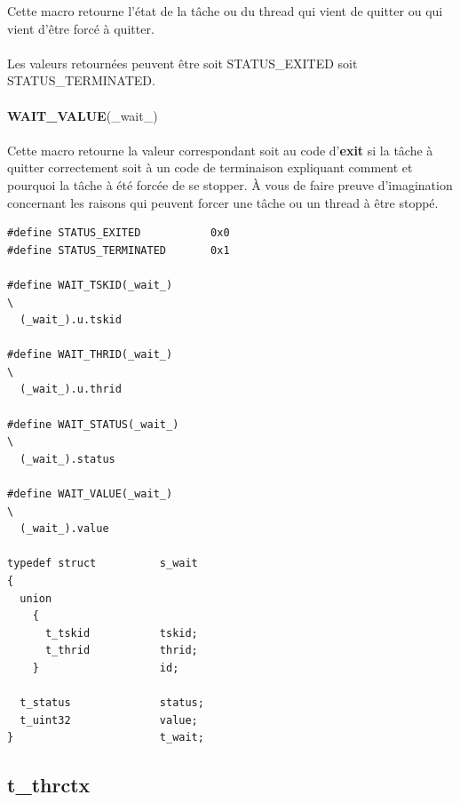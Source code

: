 \documentclass[10pt,a4wide]{article}
\begin{document}
Cette macro retourne l'\'etat de la t\^ache ou du thread qui vient de
quitter ou qui vient d'\^etre forc\'e \`a quitter.

\paragraph{}

Les valeurs retourn\'ees peuvent \^etre soit STATUS\_EXITED
soit STATUS\_TERMINATED.

\paragraph{}

\hspace{1.5cm}\textbf{WAIT\_VALUE}(\_wait\_)

\paragraph{}

Cette macro retourne la valeur correspondant soit au code d'\textbf{exit}
si la t\^ache \`a quitter correctement soit \`a un code de terminaison
expliquant comment et pourquoi la t\^ache \`a \'et\'e forc\'ee de se stopper.
\`A vous de faire preuve d'imagination concernant les raisons qui peuvent
forcer une t\^ache ou un thread \`a \^etre stopp\'e.

\begin{verbatim}
#define STATUS_EXITED           0x0
#define STATUS_TERMINATED       0x1

#define WAIT_TSKID(_wait_)                                              \
  (_wait_).u.tskid

#define WAIT_THRID(_wait_)                                              \
  (_wait_).u.thrid

#define WAIT_STATUS(_wait_)                                             \
  (_wait_).status

#define WAIT_VALUE(_wait_)                                              \
  (_wait_).value

typedef struct          s_wait
{
  union
    {
      t_tskid           tskid;
      t_thrid           thrid;
    }                   id;

  t_status              status;
  t_uint32              value;
}                       t_wait;
\end{verbatim}

\subsection{t\_thrctx}
\end{document}
